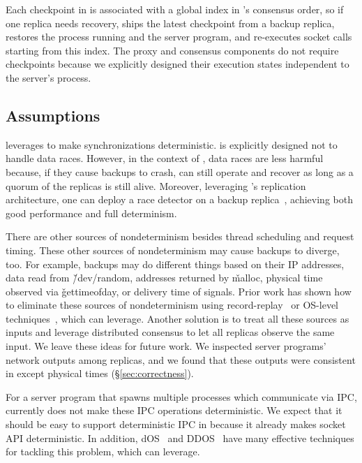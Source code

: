Each checkpoint in \xxx is associated with a global index in \paxos's consensus 
order, so if one replica needs recovery, \xxx ships the latest checkpoint from a 
backup replica, restores the process running \dmt and the server program, and 
re-executes socket calls starting from this index. The proxy and consensus 
components do not require checkpoints because we explicitly designed their 
execution states independent to the server's process.


\subsection{Assumptions} \label{sec:limit}

\xxx leverages \parrot to make synchronizations deterministic.  \parrot is
explicitly designed not to handle data races. However, in the context of \xxx,
data races are less harmful because, if they cause backups to crash, \xxx
can still operate and recover as long as a quorum of the replicas is
still alive. Moreover, leveraging \xxx's replication architecture, one can 
deploy a race detector on a backup replica~\cite{repframe:apsys15}, achieving 
both good \xxx performance and full determinism.

There are other sources of nondeterminism besides thread scheduling and
request timing.  These other sources of nondeterminism may cause backups
to diverge, too.  For example, backups may do different things based on
their IP addresses, data read from \v{/dev/random}, addresses returned by
\v{malloc}, physical time observed via \v{gettimeofday}, or delivery time
of signals.  Prior work has shown how to eliminate these sources of
nondeterminism using record-replay~\cite{scribe:sigmetrics2010, 
respec:asplos10} or OS-level techniques~\cite{dos:osdi10}, which \xxx can 
leverage.  Another solution is to treat all these sources as inputs and 
leverage distributed consensus to let all replicas observe the same input.  We 
leave these ideas for future work. We inspected server 
programs' network outputs among replicas, and we found that these outputs 
were consistent in \xxx except physical times (\S\ref{sec:correctness}).

For a server program that spawns multiple processes which communicate via
IPC, \xxx currently does not make these IPC operations deterministic.  We
expect that it should be easy to support deterministic IPC in \xxx because it
already makes socket API deterministic.  In addition,
dOS~\cite{dos:osdi10} and DDOS~\cite{ddos:asplos13} have many effective
techniques for tackling this problem, which \xxx can leverage.

